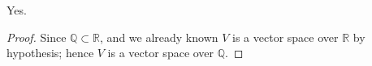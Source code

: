 \begin{Exercise}
	\begin{answer}
		Yes.
	\end{answer}
	\begin{proof}
		Since $\mathbb{Q}\subset \mathbb{R}$, and we already known $V$ is a vector space over $\mathbb{R}$ by hypothesis; hence $V$ is a vector space over $\mathbb{Q}$.
	\end{proof}
\end{Exercise}